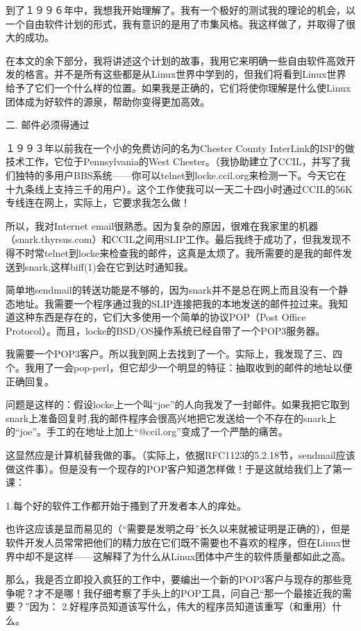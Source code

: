 \documentclass[a4paper,12pt,UTF8,twoside]{ctexbook}
\begin{document}
到了１９９６年中，我想我开始理解了。我有一个极好的测试我的理论的机会，以一个自由软件计划的形式，我有意识的是用了市集风格。我这样做了，并取得了很大的成功。


在本文的余下部分，我将讲述这个计划的故事，我用它来明确一些自由软件高效开发的格言。并不是所有这些都是从Linux世界中学到的，但我们将看到Linux世界给予了它们一个什么样的位置。如果我是正确的，它们将使你理解是什么使Linux团体成为好软件的源泉，帮助你变得更加高效。


二. 邮件必须得通过


１９９３年以前我在一个小的免费访问的名为Chester County InterLink的ISP的做技术工作，它位于Pennsylvania的West Chester。（我协助建立了CCIL，并写了我们独特的多用户BBS系统——你可以telnet到locke.ccil.org来检测一下。今天它在十九条线上支持三千的用户）。这个工作使我可以一天二十四小时通过CCIL的56K专线连在网上，实际上，它要求我怎么做！


所以，我对Internet email很熟悉。因为复杂的原因，很难在我家里的机器（snark.thyrsus.com）和CCIL之间用SLIP工作。最后我终于成功了，但我发现不得不时常telnet到locke来检查我的邮件，这真是太烦了。我所需要的是我的邮件发送到snark,这样biff(1)会在它到达时通知我。


简单地sendmail的转送功能是不够的，因为snark并不是总在网上而且没有一个静态地址。我需要一个程序通过我的SLIP连接把我的本地发送的邮件拉过来。我知道这种东西是存在的，它们大多使用一个简单的协议POP（Post Office Protocol）。而且，locke的BSD/OS操作系统已经自带了一个POP3服务器。


我需要一个POP3客户。所以我到网上去找到了一个。实际上，我发现了三、四个。我用了一会pop-perl，但它却少一个明显的特征：抽取收到的邮件的地址以便正确回复。


问题是这样的：假设locke上一个叫“joe”的人向我发了一封邮件。如果我把它取到snark上准备回复时,我的邮件程序会很高兴地把它发送给一个不存在的snark上的“joe”。手工的在地址上加上“@ccil.org”变成了一个严酷的痛苦。


这显然应是计算机替我做的事。（实际上，依据RFC1123的5.2.18节，sendmail应该做这件事）。但是没有一个现存的POP客户知道怎样做！于是这就给我们上了第一课：

1.每个好的软件工作都开始于搔到了开发者本人的痒处。

也许这应该是显而易见的（“需要是发明之母”长久以来就被证明是正确的），但是软件开发人员常常把他们的精力放在它们既不需要也不喜欢的程序，但在Linux世界中却不是这样——这解释了为什么从Linux团体中产生的软件质量都如此之高。


那么，我是否立即投入疯狂的工作中，要编出一个新的POP3客户与现存的那些竞争呢？才不是哪！我仔细考察了手头上的POP工具，问自己“那一个最接近我的需要？”因为：
2.好程序员知道该写什么，伟大的程序员知道该重写（和重用）什么。
\end{document}
